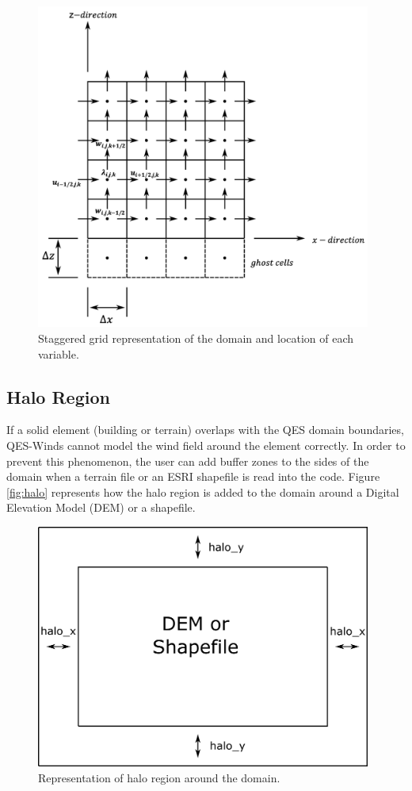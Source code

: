 \begin{figure}[h!]
\includegraphics[width=11cm]{Images/staggered_grid_full.png}
\caption{Staggered grid representation of the domain and location of each variable.}
\end{figure}

\subsection{Halo Region}

If a solid element (building or terrain) overlaps with the QES domain boundaries, QES-Winds cannot model the wind field around the element correctly. In order to prevent this phenomenon, the user can add buffer zones to the sides of the domain when a terrain file or an ESRI shapefile is read into the code. Figure \ref{fig:halo} represents how the halo region is added to the domain around a Digital Elevation Model (DEM) or a shapefile.

\begin{figure}[h!]
\centering
\includegraphics[width=11.0cm,keepaspectratio]{Images/domain_halo.png}
\caption{Representation of halo region around the domain.}
\end{figure}

